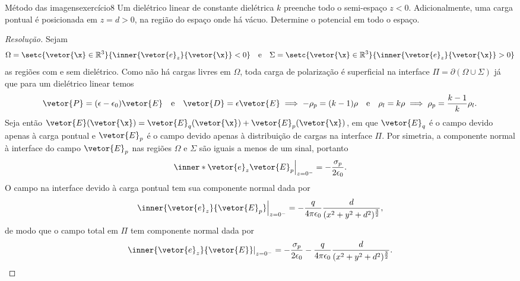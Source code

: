 \begin{exercício}{Método das imagens}{exercício8}
    Um dielétrico linear de constante dielétrica \(k\) preenche todo o semi-espaço \(z < 0\). Adicionalmente, uma carga pontual é posicionada em \(z = d > 0\), na região do espaço onde há vácuo. Determine o potencial em todo o espaço.
\end{exercício}
\begin{proof}[Resolução]
    Sejam
    \begin{equation*}
        \Omega = \setc{\vetor{\x}\in \mathbb{R}^3}{\inner{\vetor{e}_z}{\vetor{\x}} < 0}
        \quad\text{e}\quad
        \Sigma = \setc{\vetor{\x}\in \mathbb{R}^3}{\inner{\vetor{e}_z}{\vetor{\x}} > 0}
    \end{equation*}
    as regiões com e sem dielétrico. Como não há cargas livres em \(\Omega\), toda carga de polarização é superficial na interface \(\Pi = \partial (\Omega \cup \Sigma)\) já que para um dielétrico linear temos
    \begin{equation*}
        \vetor{P} = (\epsilon - \epsilon_0)\vetor{E}\quad\text{e}\quad\vetor{D} = \epsilon \vetor{E} \implies -\rho_p = (k - 1)\rho\quad\text{e}\quad\rho_l = k \rho \implies \rho_p = \frac{k - 1}{k} \rho_l.
    \end{equation*}
    Seja então \(\vetor{E}(\vetor{\x}) = \vetor{E}_q(\vetor{\x}) + \vetor{E}_p(\vetor{\x})\), em que \(\vetor{E}_q\) é o campo devido apenas à carga pontual e \(\vetor{E}_p\) é o campo devido apenas à distribuição de cargas na interface \(\Pi\). Por simetria, a componente normal à interface do campo \(\vetor{E}_p\) nas regiões \(\Omega\) e \(\Sigma\) são iguais a menos de um sinal, portanto
    \begin{equation*}
        \left.\inner*{\vetor{e}_z}{\vetor{E}_p}\right|_{z = 0^-} = -\frac{\sigma_p}{2 \epsilon_0}.
    \end{equation*}
    O campo na interface devido à carga pontual tem sua componente normal dada por
    \begin{equation*}
        \left.\inner{\vetor{e}_z}{\vetor{E}_p}\right|_{z = 0^-} =-\frac{q}{4\pi \epsilon_0} \frac{d}{(x^2 + y^2 + d^2)^{\frac32}},
    \end{equation*}
    de modo que o campo total em \(\Pi\) tem componente normal dada por
    \begin{equation*}
        \left.\inner{\vetor{e}_z}{\vetor{E}}\right|_{z = 0^{-}} =-\frac{\sigma_p}{2 \epsilon_0} - \frac{q}{4\pi \epsilon_0} \frac{d}{(x^2 + y^2 + d^2)^{\frac32}}.
    \end{equation*}

\end{proof}
